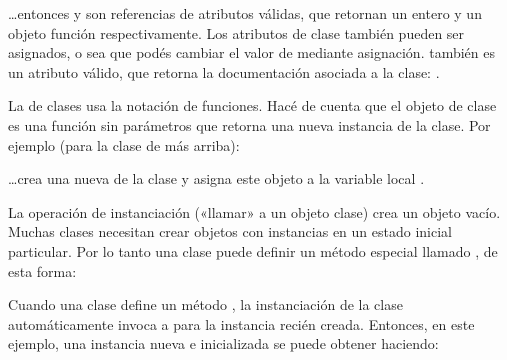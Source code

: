 \documentclass[a4,10pt,spanish]{sphinxmanual}
\begin{document}
\sphinxAtStartPar
…entonces  y  son referencias de atributos válidas, que retornan un entero y un objeto función respectivamente.  Los atributos de clase también pueden ser asignados, o sea que podés cambiar el valor de  mediante asignación.   también es un atributo válido, que retorna la documentación asociada a la clase: .

\sphinxAtStartPar
La  de clases usa la notación de funciones.  Hacé de cuenta que el objeto de clase es una función sin parámetros que retorna una nueva instancia de la clase.  Por ejemplo (para la clase de más arriba):

\begin{sphinxVerbatim}[commandchars=\\\{\}]
  
\end{sphinxVerbatim}

\sphinxAtStartPar
…crea una nueva  de la clase y asigna este objeto a la variable local .

\sphinxAtStartPar
La operación de instanciación («llamar» a un objeto clase) crea un objeto vacío.  Muchas clases necesitan crear objetos con instancias en un estado inicial particular.  Por lo tanto una clase puede definir un método especial llamado , de esta forma:

\begin{sphinxVerbatim}[commandchars=\\\{\}]
 
      \PYG{p}{[}\PYG{p}{]}
\end{sphinxVerbatim}

\sphinxAtStartPar
Cuando una clase define un método , la instanciación de la clase automáticamente invoca a  para la instancia recién creada.  Entonces, en este ejemplo, una instancia nueva e inicializada se puede obtener haciendo:

\begin{sphinxVerbatim}[commandchars=\\\{\}]
  
\end{sphinxVerbatim}
\end{document}
